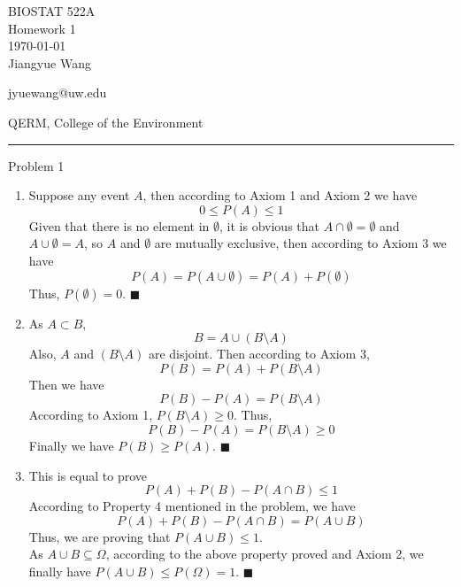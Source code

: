 \documentclass[12pt,letterpaper, onecolumn]{exam}
\begin{document}
\begingroup  
    \centering
    \LARGE BIOSTAT 522A\\
    \LARGE Homework 1\\[0.5em]
    \large \today\\[0.5em]
    \large Jiangyue Wang\par
    \large jyuewang@uw.edu\par
    \large QERM, College of the Environment\par
\endgroup
\rule{\textwidth}{0.4pt}
\pointsdroppedatright   %
\printanswers
\renewcommand{\solutiontitle}{\noindent\textbf{Ans:}\enspace}   %

\begin{questions}

    \question Problem 1
    
    \begin{solution}
           \begin{enumerate}
               \item Suppose any event $A$, then according to Axiom 1 and Axiom 2 we have 
               $$0 \leq P(A) \leq 1$$ 
               Given that there is no element in $\emptyset$, it is obvious that $A \cap \emptyset = \emptyset$ and $A \cup \emptyset = A$, so $A$ and $\emptyset$ are mutually exclusive, then according to Axiom 3 we have 
               $$P(A) = P(A \cup \emptyset) = P(A) + P(\emptyset)$$
               Thus, $P(\emptyset) = 0$. $\blacksquare$
               
               \item As $A \subset B$, $$B = A \cup (B \setminus A)$$
               Also, $A$ and $(B \setminus A)$ are disjoint. Then according to Axiom 3, $$P(B) = P(A) + P(B \setminus A)$$ 
               Then we have $$P(B) - P(A) = P(B \setminus A)$$
               According to Axiom 1, $P(B \setminus A) \geq 0$. Thus, $$P(B) - P(A) = P(B \setminus A) \geq 0$$
               Finally we have $P(B) \geq P(A)$. $\blacksquare$
               
               \item This is equal to prove $$P(A) + P(B) -P(A \cap B) \leq 1$$
               According to Property 4 mentioned in the problem, we have $$P(A) + P(B) -P(A \cap B) = P(A \cup B)$$
               Thus, we are proving that $P(A \cup B) \leq 1$.\\
               As $A \cup B \subseteq \Omega$, according to the above property proved and Axiom 2, we finally have $P(A \cup B) \leq P(\Omega) = 1$. $\blacksquare$


\end{enumerate}
\end{solution}
\end{questions}
\end{document}
